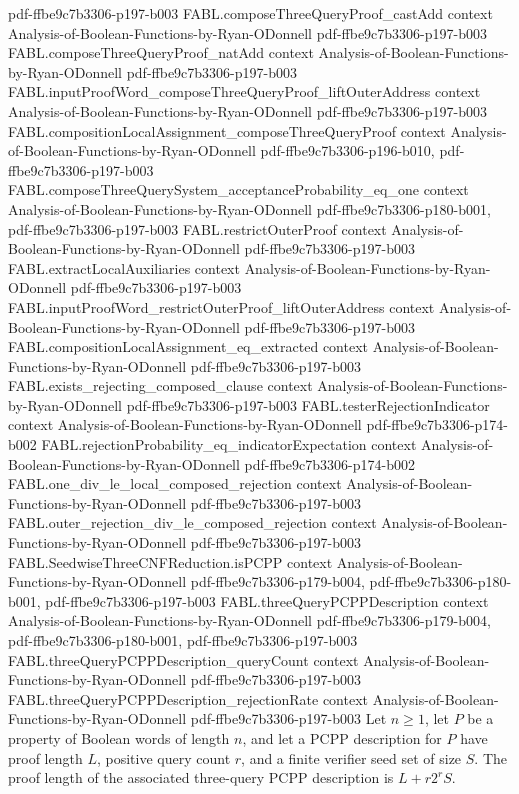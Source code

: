 \begin{theorem}
  {pdf-ffbe9c7b3306-p197-b003}
\proofstep
  {FABL.composeThreeQueryProof_castAdd}
  {context}
  {Analysis-of-Boolean-Functions-by-Ryan-ODonnell}
  {pdf-ffbe9c7b3306-p197-b003}
\proofstep
  {FABL.composeThreeQueryProof_natAdd}
  {context}
  {Analysis-of-Boolean-Functions-by-Ryan-ODonnell}
  {pdf-ffbe9c7b3306-p197-b003}
\proofstep
  {FABL.inputProofWord_composeThreeQueryProof_liftOuterAddress}
  {context}
  {Analysis-of-Boolean-Functions-by-Ryan-ODonnell}
  {pdf-ffbe9c7b3306-p197-b003}
\proofstep
  {FABL.compositionLocalAssignment_composeThreeQueryProof}
  {context}
  {Analysis-of-Boolean-Functions-by-Ryan-ODonnell}
  {pdf-ffbe9c7b3306-p196-b010,
    pdf-ffbe9c7b3306-p197-b003}
\proofstep
  {FABL.composeThreeQuerySystem_acceptanceProbability_eq_one}
  {context}
  {Analysis-of-Boolean-Functions-by-Ryan-ODonnell}
  {pdf-ffbe9c7b3306-p180-b001,
    pdf-ffbe9c7b3306-p197-b003}
\proofstep
  {FABL.restrictOuterProof}
  {context}
  {Analysis-of-Boolean-Functions-by-Ryan-ODonnell}
  {pdf-ffbe9c7b3306-p197-b003}
\proofstep
  {FABL.extractLocalAuxiliaries}
  {context}
  {Analysis-of-Boolean-Functions-by-Ryan-ODonnell}
  {pdf-ffbe9c7b3306-p197-b003}
\proofstep
  {FABL.inputProofWord_restrictOuterProof_liftOuterAddress}
  {context}
  {Analysis-of-Boolean-Functions-by-Ryan-ODonnell}
  {pdf-ffbe9c7b3306-p197-b003}
\proofstep
  {FABL.compositionLocalAssignment_eq_extracted}
  {context}
  {Analysis-of-Boolean-Functions-by-Ryan-ODonnell}
  {pdf-ffbe9c7b3306-p197-b003}
\proofstep
  {FABL.exists_rejecting_composed_clause}
  {context}
  {Analysis-of-Boolean-Functions-by-Ryan-ODonnell}
  {pdf-ffbe9c7b3306-p197-b003}
\proofstep
  {FABL.testerRejectionIndicator}
  {context}
  {Analysis-of-Boolean-Functions-by-Ryan-ODonnell}
  {pdf-ffbe9c7b3306-p174-b002}
\proofstep
  {FABL.rejectionProbability_eq_indicatorExpectation}
  {context}
  {Analysis-of-Boolean-Functions-by-Ryan-ODonnell}
  {pdf-ffbe9c7b3306-p174-b002}
\proofstep
  {FABL.one_div_le_local_composed_rejection}
  {context}
  {Analysis-of-Boolean-Functions-by-Ryan-ODonnell}
  {pdf-ffbe9c7b3306-p197-b003}
\proofstep
  {FABL.outer_rejection_div_le_composed_rejection}
  {context}
  {Analysis-of-Boolean-Functions-by-Ryan-ODonnell}
  {pdf-ffbe9c7b3306-p197-b003}
\proofstep
  {FABL.SeedwiseThreeCNFReduction.isPCPP}
  {context}
  {Analysis-of-Boolean-Functions-by-Ryan-ODonnell}
  {pdf-ffbe9c7b3306-p179-b004,
    pdf-ffbe9c7b3306-p180-b001,
    pdf-ffbe9c7b3306-p197-b003}
\proofstep
  {FABL.threeQueryPCPPDescription}
  {context}
  {Analysis-of-Boolean-Functions-by-Ryan-ODonnell}
  {pdf-ffbe9c7b3306-p179-b004,
    pdf-ffbe9c7b3306-p180-b001,
    pdf-ffbe9c7b3306-p197-b003}
\proofstep
  {FABL.threeQueryPCPPDescription_queryCount}
  {context}
  {Analysis-of-Boolean-Functions-by-Ryan-ODonnell}
  {pdf-ffbe9c7b3306-p197-b003}
\proofstep
  {FABL.threeQueryPCPPDescription_rejectionRate}
  {context}
  {Analysis-of-Boolean-Functions-by-Ryan-ODonnell}
  {pdf-ffbe9c7b3306-p197-b003}
Let $n\ge 1$, let $P$ be a property of Boolean words of length $n$, and let a PCPP
description for $P$ have proof length $L$, positive query count $r$, and a finite
verifier seed set of size $S$. The proof length of the associated three-query PCPP
description is $L+r2^rS$.
\end{theorem}

